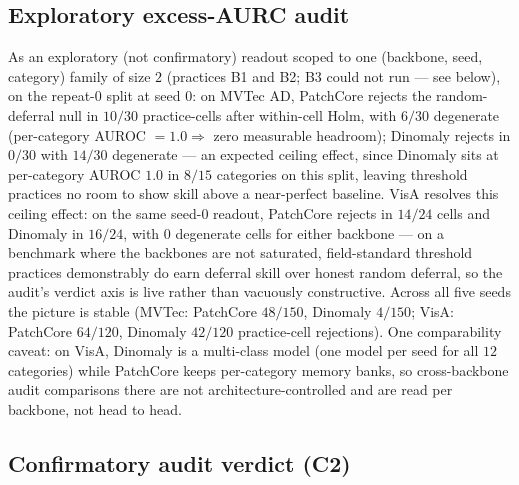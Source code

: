 \documentclass[preprint,11pt]{elsarticle}
\begin{document}
\subsection{Exploratory excess-AURC audit}
\label{sec:auditres}

As an exploratory (not confirmatory) readout scoped to one (backbone, seed, category) family of
size $2$ (practices B1 and B2; B3 could not run --- see below), on the
repeat-$0$ split at seed $0$: on MVTec AD, PatchCore rejects the random-deferral null in $10/30$
practice-cells after within-cell Holm, with $6/30$ degenerate (per-category AUROC $=1.0
\Rightarrow$ zero measurable headroom); Dinomaly rejects in $0/30$ with $14/30$ degenerate ---
an expected ceiling effect, since Dinomaly sits at per-category AUROC $1.0$ in $8/15$
categories on this split, leaving threshold practices no room to show skill above a near-perfect
baseline. VisA resolves this ceiling effect: on the same seed-$0$ readout, PatchCore
rejects in $14/24$ cells and Dinomaly in $16/24$, with $0$ degenerate cells for either backbone
--- on a benchmark where the backbones are not saturated, field-standard threshold practices
demonstrably do earn deferral skill over honest random deferral, so the audit's verdict axis is
live rather than vacuously constructive. Across all five seeds the picture is stable (MVTec:
PatchCore $48/150$, Dinomaly $4/150$; VisA: PatchCore $64/120$, Dinomaly $42/120$ practice-cell
rejections). One comparability caveat: on VisA, Dinomaly is a multi-class model (one model per
seed for all $12$ categories) while PatchCore keeps per-category memory banks, so cross-backbone
audit comparisons there are not architecture-controlled and are read per backbone, not head to
head.

\subsection{Confirmatory audit verdict (C2)}
\label{sec:c2}
\end{document}
